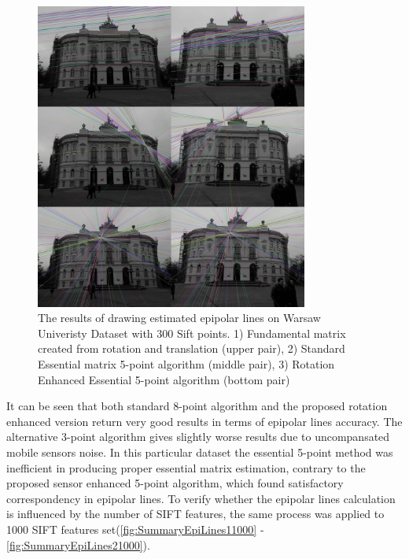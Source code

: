 \begin{figure}[ht!]
    \centering
    \includegraphics[width=0.8\textwidth]{summary2Sift300}
    \caption{The results of drawing estimated epipolar lines on Warsaw Univeristy Dataset with 300 Sift points. 1) Fundamental matrix created from rotation and translation (upper pair), 2) Standard Essential matrix 5-point algorithm (middle pair), 3) Rotation Enhanced Essential 5-point algorithm (bottom pair) }
    \label{fig:SummaryEpiLines2300}
\end{figure}
It can be seen that both standard 8-point algorithm and the proposed rotation enhanced version return very good results in terms of epipolar lines accuracy. The alternative 3-point algorithm gives slightly worse results due to uncompansated mobile sensors noise. In this particular dataset the essential 5-point method was inefficient in producing proper essential matrix estimation, contrary to the proposed sensor enhanced 5-point algorithm, which found satisfactory correspondency in epipolar lines. \newline
To verify whether the epipolar lines calculation is influenced by the number of SIFT features, the same process was applied to 1000 SIFT features set(\ref{fig:SummaryEpiLines11000} - \ref{fig:SummaryEpiLines21000}). 
